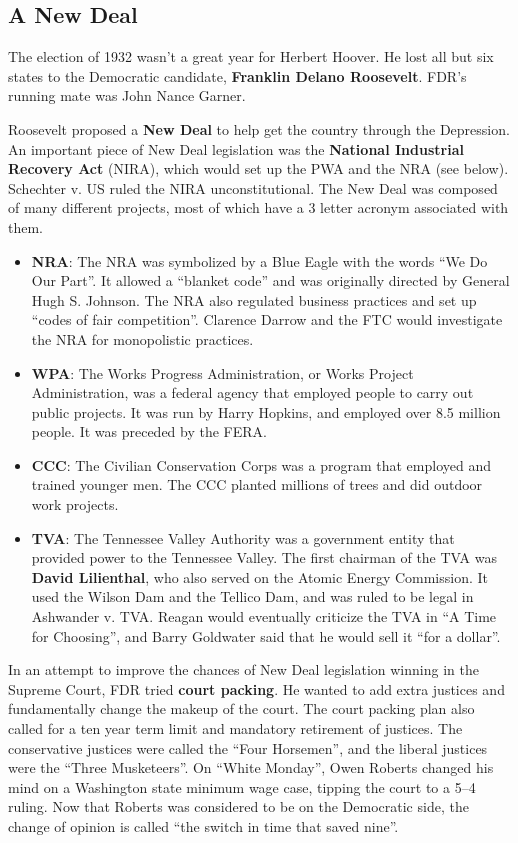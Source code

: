 \subsection*{A New Deal}

The election of 1932 wasn't a great year for Herbert Hoover.
He lost all but six states to the Democratic candidate, \textbf{Franklin Delano Roosevelt}.
FDR's running mate was John Nance Garner.

Roosevelt proposed a \textbf{New Deal} to help get the country through the Depression.
An important piece of New Deal legislation was the \textbf{National Industrial Recovery Act} (NIRA),
which would set up the PWA and the NRA (see below).
Schechter v. US ruled the NIRA unconstitutional.
The New Deal was composed of many different projects, most of which have a 3 letter acronym associated with them.

\begin{itemize}
  \item
    \textbf{NRA}:
    The NRA was symbolized by a Blue Eagle with the words ``We Do Our Part''.
    It allowed a ``blanket code'' and was originally directed by General Hugh S. Johnson.
    The NRA also regulated business practices and set up ``codes of fair competition''.
    Clarence Darrow and the FTC would investigate the NRA for monopolistic practices.

  \item
    \textbf{WPA}:
    The Works Progress Administration, or Works Project Administration,
    was a federal agency that employed people to carry out public projects.
    It was run by Harry Hopkins, and employed over 8.5 million people.
    It was preceded by the FERA\@.

  \item
    \textbf{CCC}:
    The Civilian Conservation Corps was a program that employed and trained younger men.
    The CCC planted millions of trees and did outdoor work projects.

  \item
    \textbf{TVA}:
    The Tennessee Valley Authority was a government entity that provided power to the Tennessee Valley.
    The first chairman of the TVA was \textbf{David Lilienthal},
    who also served on the Atomic Energy Commission.
    It used the Wilson Dam and the Tellico Dam, and was ruled to be legal in Ashwander v. TVA\@.
    Reagan would eventually criticize the TVA in ``A Time for Choosing'',
    and Barry Goldwater said that he would sell it ``for a dollar''.
\end{itemize}

In an attempt to improve the chances of New Deal legislation winning in the Supreme Court,
FDR tried \textbf{court packing}.
He wanted to add extra justices and fundamentally change the makeup of the court.
The court packing plan also called for a ten year term limit and mandatory retirement of justices.
The conservative justices were called the ``Four Horsemen'',
and the liberal justices were the ``Three Musketeers''.
On ``White Monday'', Owen Roberts changed his mind on a Washington state minimum wage case,
tipping the court to a 5--4 ruling.
Now that Roberts was considered to be on the Democratic side,
the change of opinion is called ``the switch in time that saved nine''.
